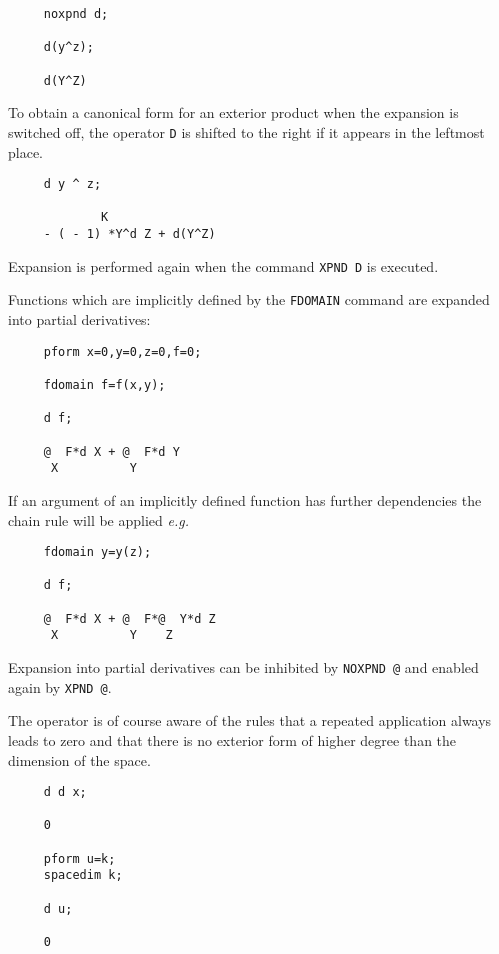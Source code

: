 \begin{verbatim}
     noxpnd d;

     d(y^z);

     d(Y^Z)
\end{verbatim}

To obtain a canonical form for an exterior product when the expansion
is switched off, the operator {\tt D} is shifted to the right if it
appears in the leftmost place.

\begin{verbatim}
     d y ^ z;

             K
     - ( - 1) *Y^d Z + d(Y^Z)
\end{verbatim}

Expansion is performed again when the command {\tt XPND D}\label{XPNDD}
is executed. 

Functions which are implicitly defined by the {\tt FDOMAIN} command are
expanded into partial derivatives:

\begin{verbatim}
     pform x=0,y=0,z=0,f=0;

     fdomain f=f(x,y);

     d f;

     @  F*d X + @  F*d Y
      X          Y
\end{verbatim}

If an argument of an implicitly defined function has further
dependencies the chain rule will be applied {\em e.g.} 


\begin{verbatim}
     fdomain y=y(z);

     d f;

     @  F*d X + @  F*@  Y*d Z
      X          Y    Z
\end{verbatim}

Expansion into partial derivatives can be inhibited by
{\tt NOXPND @}\label{NOXPNDA}
and enabled again by {\tt XPND @}\label{XPNDA}.
 

The operator is of course aware of the rules that a repeated
application always leads to zero and that there is no exterior form of
higher degree than the dimension of the space.

\begin{verbatim}
     d d x;

     0

     pform u=k;
     spacedim k;

     d u;

     0
\end{verbatim}
